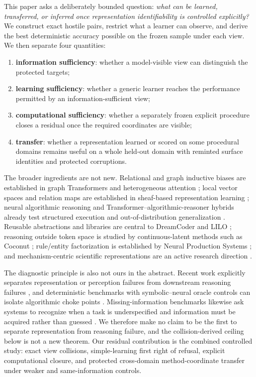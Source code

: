 \documentclass[10pt]{article}
\begin{document}
This paper asks a deliberately bounded question: \emph{what can be learned, transferred, or inferred once representation identifiability is controlled explicitly?} We construct exact hostile pairs, restrict what a learner can observe, and derive the best deterministic accuracy possible on the frozen sample under each view. We then separate four quantities:
\begin{enumerate}
    \item \textbf{information sufficiency}: whether a model-visible view can distinguish the protected targets;
    \item \textbf{learning sufficiency}: whether a generic learner reaches the performance permitted by an information-sufficient view;
    \item \textbf{computational sufficiency}: whether a separately frozen explicit procedure closes a residual once the required coordinates are visible;
    \item \textbf{transfer}: whether a representation learned or scored on some procedural domains remains useful on a whole held-out domain with reminted surface identities and protected corruptions.
\end{enumerate}

The broader ingredients are not new. Relational and graph inductive biases are established in graph Transformers and heterogeneous attention \citep{ying2021graphormer,hu2020hgt,rampasek2022gps}; local vector spaces and relation maps are established in sheaf-based representation learning \citep{gebhart2021knowledge,bodnar2022sheaf}; neural algorithmic reasoning and Transformer--algorithmic-reasoner hybrids already test structured execution and out-of-distribution generalization \citep{velickovic2022clrs,bounsi2024transnar}. Reusable abstractions and libraries are central to DreamCoder and LILO \citep{ellis2020dreamcoder,grand2023lilo}; reasoning outside token space is studied by continuous-latent methods such as Coconut \citep{hao2024coconut}; rule/entity factorization is established by Neural Production Systems \citep{goyal2021nps}; and mechanism-centric scientific representations are an active research direction \citep{posner2026mwm}.

The diagnostic principle is also not ours in the abstract. Recent work explicitly separates representation or perception failures from downstream reasoning failures \citep{liem2026temporal}, and deterministic benchmarks with symbolic--neural oracle controls can isolate algorithmic choke points \citep{anonymous2026chokepoints}. Missing-information benchmarks likewise ask systems to recognize when a task is underspecified and information must be acquired rather than guessed \citep{li2025questbench}. We therefore make no claim to be the first to separate representation from reasoning failure, and the collision-derived ceiling below is not a new theorem. Our residual contribution is the combined controlled study: exact view collisions, simple-learning first right of refusal, explicit computational closure, and protected cross-domain method-coordinate transfer under weaker and same-information controls.
\end{document}
